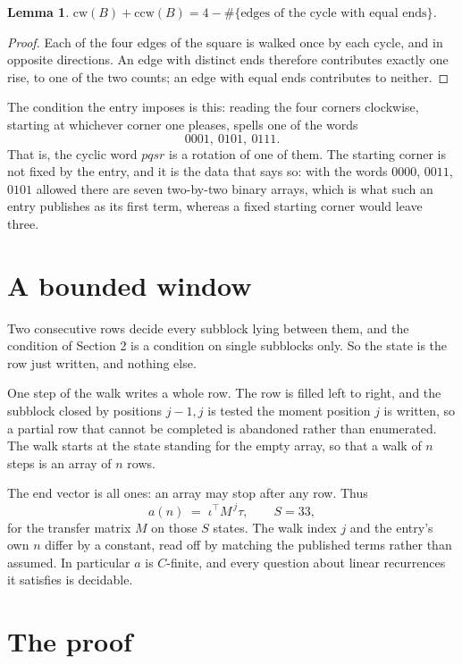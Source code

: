 \documentclass[11pt,a4paper]{article}
\theoremstyle{plain}
\newtheorem{lemma}[theorem]{Lemma}
\theoremstyle{definition}
\begin{document}
\begin{lemma}\label{lem:sum}
$\mathrm{cw}(B)+\mathrm{ccw}(B)=4-\#\{\text{edges of the cycle with equal ends}\}$.
\end{lemma}

\begin{proof}
Each of the four edges of the square is walked once by each cycle, and in opposite directions.
An edge with distinct ends therefore contributes exactly one rise, to one of the two counts;
an edge with equal ends contributes to neither.
\end{proof}

The condition the entry imposes is this: reading the four corners clockwise, starting at whichever corner one pleases, spells one of the words
\[
0001,\ 0101,\ 0111.
\]
That is, the cyclic word $pqsr$ is a rotation of one of them. The starting corner is not fixed by the entry, and it is the data that says so: with the words $0000$, $0011$, $0101$ allowed there are seven two-by-two binary arrays, which is what such an entry publishes as its first term, whereas a fixed starting corner would leave three.

\section{A bounded window}

Two consecutive rows decide every subblock lying between them, and the condition of Section 2 is a condition on single subblocks only. So the state is the row just written, and nothing else.

One step of the walk writes a whole row. The row is filled left to right, and the subblock
closed by positions $j-1,j$ is tested the moment position $j$ is written, so a partial row that
cannot be completed is abandoned rather than enumerated. The walk starts at the state standing
for the empty array, so that a walk of $n$ steps is an array of $n$ rows.

The end vector is all ones: an array may stop after any row. Thus
\[
a(n)\;=\;\iota^{\!\top}M^{\,j}\tau ,\qquad S=33,
\]
for the transfer matrix $M$ on those $S$ states. The walk index $j$ and the entry's own $n$
differ by a constant, read off by matching the published terms rather than assumed. In
particular $a$ is $C$-finite, and every question about linear recurrences it satisfies is
decidable.

\section{The proof}
\end{document}
